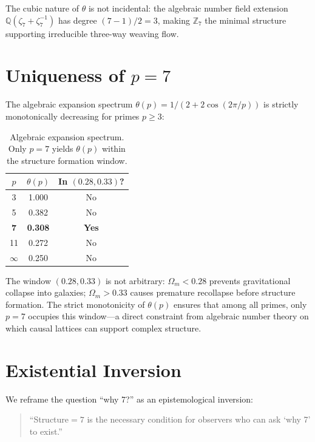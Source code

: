 \documentclass[aps,prl,twocolumn,nofootinbib,floatfix]{revtex4-2}
\begin{document}
The cubic nature of $\theta$ is not incidental: the algebraic number field extension $\mathbb{Q}(\zeta_7 + \zeta_7^{-1})$ has degree $(7-1)/2 = 3$, making $\mathbb{Z}_7$ the minimal structure supporting irreducible three-way weaving flow.

\section{Uniqueness of $p=7$}

The algebraic expansion spectrum $\theta(p) = 1/(2+2\cos(2\pi/p))$ is strictly monotonically decreasing for primes $p \ge 3$:

\begin{table}[h]
\centering
\begin{tabular}{ccc}
\hline
$p$ & $\theta(p)$ & In $(0.28,0.33)$? \\
\hline
3 & 1.000 & No \\
5 & 0.382 & No \\
\textbf{7} & \textbf{0.308} & \textbf{Yes} \\
11 & 0.272 & No \\
$\infty$ & 0.250 & No \\
\hline
\end{tabular}
\caption{Algebraic expansion spectrum. Only $p=7$ yields $\theta(p)$ within the structure formation window.}
\label{tab:spectrum}
\end{table}

The window $(0.28, 0.33)$ is not arbitrary: $\Omega_m < 0.28$ prevents gravitational collapse into galaxies; $\Omega_m > 0.33$ causes premature recollapse before structure formation. The strict monotonicity of $\theta(p)$ ensures that among all primes, only $p=7$ occupies this window---a direct constraint from algebraic number theory on which causal lattices can support complex structure.

\section{Existential Inversion}

We reframe the question ``why 7?'' as an epistemological inversion:

\begin{quote}
``Structure$=7$ is the necessary condition for observers who can ask `why 7' to exist.''
\end{quote}
\end{document}
